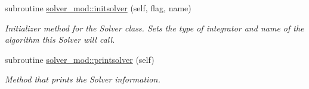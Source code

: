 \begin{DoxyCompactItemize}
subroutine \mbox{\hyperlink{namespacesolver__mod_a326292ff19880a914317109520b200b2}{solver\+\_\+mod\+::initsolver}} (self, flag, name)
\begin{DoxyCompactList}\small\item\em Initializer method for the Solver class. Sets the type of integrator and name of the algorithm this Solver will call. \end{DoxyCompactList}\item 
subroutine \mbox{\hyperlink{namespacesolver__mod_a54ea6899cce026a7a5da2dd05922628f}{solver\+\_\+mod\+::printsolver}} (self)
\begin{DoxyCompactList}\small\item\em Method that prints the Solver information. \end{DoxyCompactList}\end{DoxyCompactItemize}
